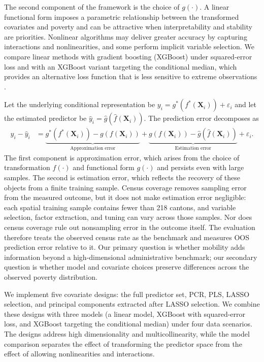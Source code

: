 \documentclass[pdflatex,sn-apa]{sn-jnl}
\begin{document}
The second component of the framework is the choice of $g(\cdot)$. A linear functional form imposes a parametric relationship between the transformed covariates and poverty and can be attractive when interpretability and stability are priorities. Nonlinear algorithms may deliver greater accuracy by capturing interactions and nonlinearities, and some perform implicit variable selection. We compare linear methods with gradient boosting (XGBoost) under squared-error loss and with an XGBoost variant targeting the conditional median, which provides an alternative loss function that is less sensitive to extreme observations \citep{chen2016xgboost}.

Let the underlying conditional representation be $y_i = g^*(f^*(\mathbf{X}_i))+ \varepsilon_i$ and let the estimated predictor be $\hat{y}_i=\hat{g}(\hat{f}(\mathbf{X}_i))$. The prediction error decomposes as
\begin{align}
y_i - \hat{y}_i
&= \underbrace{g^*(f^*(\mathbf{X}_i)) - g(f(\mathbf{X}_i))}_{\text{Approximation error}}
+ \underbrace{g(f(\mathbf{X}_i)) - \hat{g}(\hat{f}(\mathbf{X}_i))}_{\text{Estimation error}}
+ \varepsilon_i.
\label{eq:error_decomposition}
\end{align}
The first component is approximation error, which arises from the choice of transformation $f(\cdot)$ and functional form $g(\cdot)$ and persists even with large samples. The second is estimation error, which reflects the recovery of these objects from a finite training sample. Census coverage removes sampling error from the measured outcome, but it does not make estimation error negligible: each spatial training sample contains fewer than 218 cantons, and variable selection, factor extraction, and tuning can vary across those samples. Nor does census coverage rule out nonsampling error in the outcome itself. The evaluation therefore treats the observed census rate as the benchmark and measures OOS prediction error relative to it. Our primary question is whether mobility adds information beyond a high-dimensional administrative benchmark; our secondary question is whether model and covariate choices preserve differences across the observed poverty distribution.

We implement five covariate designs: the full predictor set, PCR, PLS, LASSO selection, and principal components extracted after LASSO selection. We combine these designs with three models (a linear model, XGBoost with squared-error loss, and XGBoost targeting the conditional median) under four data scenarios. The designs address high dimensionality and multicollinearity, while the model comparison separates the effect of transforming the predictor space from the effect of allowing nonlinearities and interactions.
\end{document}
